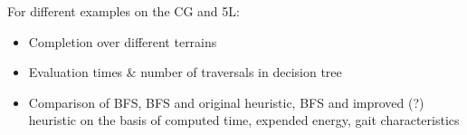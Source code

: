 For different examples on the CG and 5L:
\begin{itemize}
	\item Completion over different terrains
	\item Evaluation times \& number of traversals in decision tree
	\item Comparison of BFS, BFS and original heuristic, BFS and improved (?) heuristic on the basis of computed time, expended energy, gait characteristics
\end{itemize}
